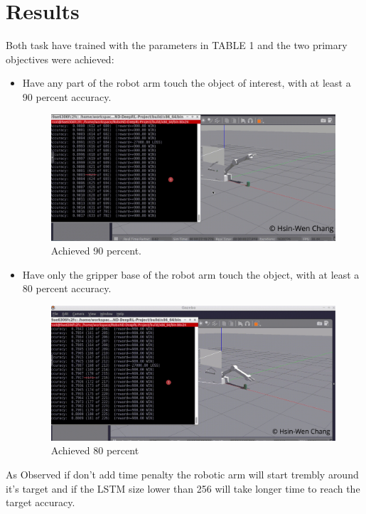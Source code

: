 \documentclass[10pt,journal,compsoc]{IEEEtran}
\begin{document}
\section{Results}
Both task have trained with the parameters in TABLE 1 and the two primary objectives were achieved:
\begin{itemize}
\item Have any part of the robot arm touch the object of interest, with at least a 90 percent accuracy. 
\begin{figure}[htpb]
      \centering
      \includegraphics[width=\linewidth]{90.png}
      \caption{Achieved 90 percent.}
      \label{fig:achieved 90 percent}
\end{figure}
\item Have only the gripper base of the robot arm touch the object, with at least a 80 percent accuracy.
\begin{figure}[htpb]
      \centering
      \includegraphics[width=\linewidth]{80.png}
      \caption{Achieved 80 percent}
      \label{fig:achieved 80 percent}
\end{figure}
\end {itemize}
As Observed if don't add time penalty the robotic arm will start trembly around it's target and if the LSTM size lower than 256 will take longer time to reach the target accuracy.
\end{document}
